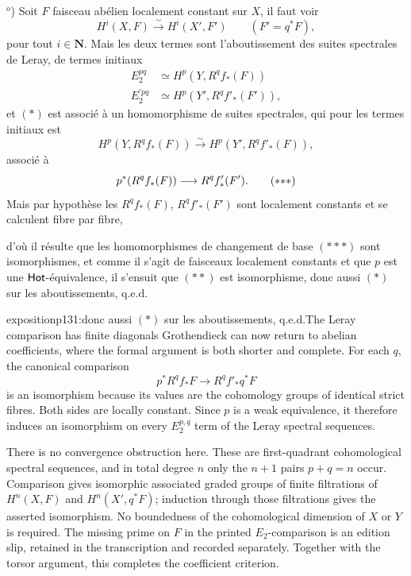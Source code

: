 $^o$) Soit $F$ faisceau abélien localement constant sur $X$, il faut voir
\[
H^i(X,F) \xrightarrow{\ \sim\ } H^i(X', F') \qquad (F' = q^*F), \tag*{$(*)$}
\]
pour tout $i \in \mathbf{N}$. Mais les deux termes sont l'aboutissement des suites spectrales de Leray, de termes initiaux
\[
\begin{aligned}
E_2^{pq} &\simeq H^p(Y, R^q f_*(F)) \\
E^{\prime pq}_2 &\simeq H^p(Y', R^q f'_*(F')),
\end{aligned}
\]
et $(*)$ est associé à un homomorphisme de suites spectrales, qui pour les termes initiaux est
\[
H^p(Y, R^q f_*(F)) \xrightarrow{\sim} H^p(Y', R^q f'_*(F)), \tag*{$(**)$} %
\]
associé à
\[
p^*(R^q f_*(F)) \longrightarrow R^q f'_*(F'). \tag*{$(*{*}*)$}
\]
Mais par hypothèse les $R^q f_*(F)$, $R^q f'_*(F')$ sont localement constants et se calculent fibre par fibre,


\noindent d'où il résulte que les homomorphismes de changement de base $(*{*}*)$ sont isomorphismes, et comme il s'agit de faisceaux localement constants et que $p$ est une $\mathsf{Hot}$-équivalence, il s'ensuit que $(**)$ est isomorphisme, donc aussi $(*)$ sur les aboutissements, q.e.d.

\begin{dcomment}{exposition}{p131:donc aussi $(*)$ sur les aboutissements, q.e.d.}{The Leray comparison has finite diagonals}
Grothendieck can now return to abelian coefficients, where the formal argument is both shorter and complete. For each \(q\), the canonical comparison
\[
 p^*R^qf_*F\longrightarrow R^qf'_*q^*F
\]
is an isomorphism because its values are the cohomology groups of identical strict fibres. Both sides are locally constant. Since \(p\) is a weak equivalence, it therefore induces an isomorphism on every \(E_2^{p,q}\) term of the Leray spectral sequences.

There is no convergence obstruction here. These are first-quadrant cohomological spectral sequences, and in total degree \(n\) only the \(n+1\) pairs \(p+q=n\) occur. Comparison gives isomorphic associated graded groups of finite filtrations of \(H^n(X,F)\) and \(H^n(X',q^*F)\); induction through those filtrations gives the asserted isomorphism. No boundedness of the cohomological dimension of \(X\) or \(Y\) is required. The missing prime on \(F\) in the printed \(E_2\)-comparison is an edition slip, retained in the transcription and recorded separately. Together with the torsor argument, this completes the coefficient criterion.
\end{dcomment}


